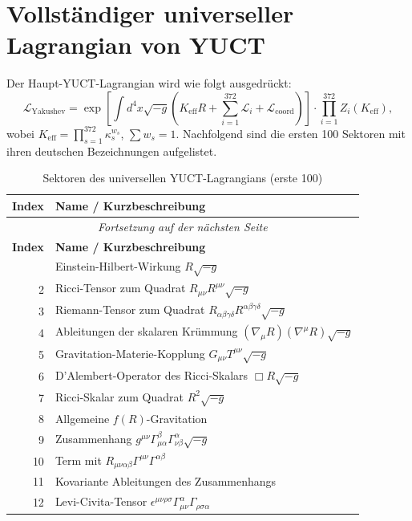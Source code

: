 \documentclass[11pt,a4paper]{article}
\begin{document}
	\section{Vollständiger universeller Lagrangian von YUCT}
	Der Haupt-YUCT-Lagrangian wird wie folgt ausgedrückt:
	\begin{equation}
		\mathcal{L}_{\text{Yakushev}} = \exp\left[\int d^4x\sqrt{-g}\left(K_{\mathrm{eff}}R + \sum_{i=1}^{372}\mathcal{L}_i + \mathcal{L}_{\text{coord}}\right)\right] \cdot \prod_{i=1}^{372} Z_i(K_{\mathrm{eff}}),
	\end{equation}
	wobei \(K_{\mathrm{eff}} = \prod_{s=1}^{372} \kappa_s^{w_s}\), \(\sum w_s = 1\). Nachfolgend sind die ersten 100 Sektoren mit ihren deutschen Bezeichnungen aufgelistet.
	\scriptsize
	\begin{longtable}{r l}
		\caption{Sektoren des universellen YUCT-Lagrangians (erste 100)}\label{tab:sectors}\\
		\toprule
		\textbf{Index} & \textbf{Name / Kurzbeschreibung} \\
		\midrule
		\endfirsthead
		\multicolumn{2}{c}{\textit{Fortsetzung auf der nächsten Seite}}\\
		\toprule
		\textbf{Index} & \textbf{Name / Kurzbeschreibung} \\
		\midrule
		\endhead
		\bottomrule
		\endfoot
		1 & Einstein-Hilbert-Wirkung \(R\sqrt{-g}\) \\
		2 & Ricci-Tensor zum Quadrat \(R_{\mu\nu}R^{\mu\nu}\sqrt{-g}\) \\
		3 & Riemann-Tensor zum Quadrat \(R_{\alpha\beta\gamma\delta}R^{\alpha\beta\gamma\delta}\sqrt{-g}\) \\
		4 & Ableitungen der skalaren Krümmung \((\nabla_\mu R)(\nabla^\mu R)\sqrt{-g}\) \\
		5 & Gravitation-Materie-Kopplung \(G_{\mu\nu}T^{\mu\nu}\sqrt{-g}\) \\
		6 & D'Alembert-Operator des Ricci-Skalars \(\Box R\sqrt{-g}\) \\
		7 & Ricci-Skalar zum Quadrat \(R^2\sqrt{-g}\) \\
		8 & Allgemeine \(f(R)\)-Gravitation \\
		9 & Zusammenhang \(g^{\mu\nu}\Gamma^{\beta}_{\mu\alpha}\Gamma^{\alpha}_{\nu\beta}\sqrt{-g}\) \\
		10 & Term mit \(R_{\mu\nu\alpha\beta}\Gamma^{\mu\nu}\Gamma^{\alpha\beta}\) \\
		11 & Kovariante Ableitungen des Zusammenhangs \\
		12 & Levi-Civita-Tensor \(\epsilon^{\mu\nu\rho\sigma}\Gamma^{\alpha}_{\mu\nu}\Gamma_{\rho\sigma\alpha}\) \\

\end{longtable}
\end{document}
